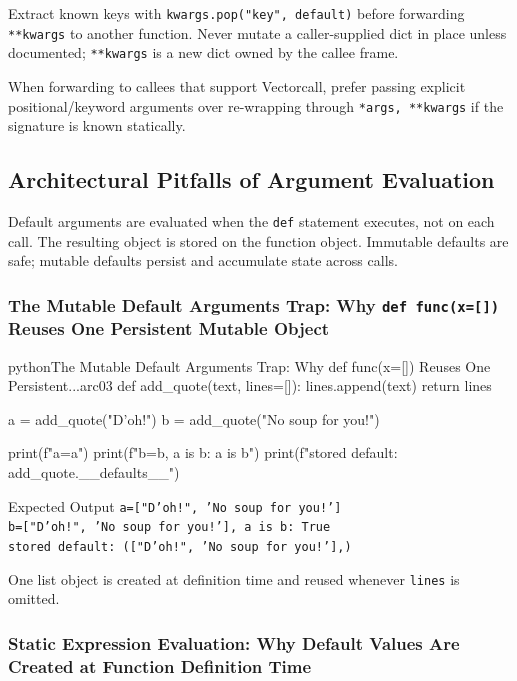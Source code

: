 \documentclass[a4paper,twoside]{report}
\begin{document}
Extract known keys with \texttt{kwargs.pop("key", default)} before forwarding \texttt{**kwargs} to another function. Never mutate a caller-supplied dict in place unless documented; \texttt{**kwargs} is a new dict owned by the callee frame.

When forwarding to callees that support Vectorcall, prefer passing explicit positional/keyword arguments over re-wrapping through \texttt{*args, **kwargs} if the signature is known statically.


\subsection{Architectural Pitfalls of Argument Evaluation}

Default arguments are evaluated when the \texttt{def} statement executes, not on each call. The resulting object is stored on the function object. Immutable defaults are safe; mutable defaults persist and accumulate state across calls.

\subsubsection{The Mutable Default Arguments Trap: Why \texttt{def func(x=[])} Reuses One Persistent Mutable Object}

\begin{codebox}[]{python}{The Mutable Default Arguments Trap: Why def func(x=[]) Reuses One Persistent...}{arc03}
def add_quote(text, lines=[]):
    lines.append(text)
    return lines

a = add_quote("D'oh!")
b = add_quote("No soup for you!")

print(f"a={a}")
print(f"b={b}, a is b: {a is b}")
print(f"stored default: {add_quote.__defaults__}")
\end{codebox}


\begin{iobox}{Expected Output}
\texttt{a=["D'oh!", 'No soup for you!']} \\
\texttt{b=["D'oh!", 'No soup for you!'], a is b: True} \\
\texttt{stored default: (["D'oh!", 'No soup for you!'],)} \\
\end{iobox}




One list object is created at definition time and reused whenever \texttt{lines} is omitted.

\subsubsection{Static Expression Evaluation: Why Default Values Are Created at Function Definition Time}
\end{document}
